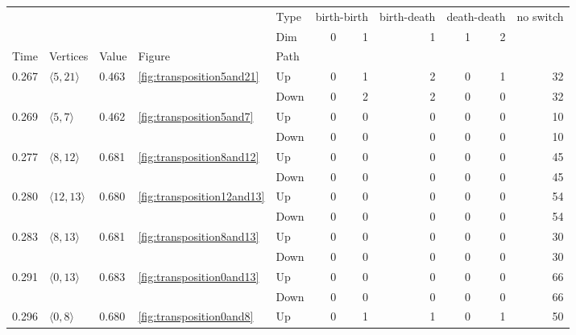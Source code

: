 \documentclass{article}
\begin{document}
\begin{center}
\begin{tabular}{lllllrrrrrr}
\toprule
 &  &  &  & Type & \multicolumn{2}{r}{birth-birth} & birth-death & \multicolumn{2}{r}{death-death} & no switch \\
 &  &  &  & Dim & 0 & 1 & 1 & 1 & 2 &  \\
Time & Vertices & Value & Figure & Path &  &  &  &  &  &  \\
\midrule
\multirow[t]{2}{*}{0.267} & \multirow[t]{2}{*}{$\langle5, 21\rangle$} & \multirow[t]{2}{*}{0.463} & \multirow[t]{2}{*}{\ref{fig:transposition5and21}} & Up & 0 & 1 & 2 & 0 & 1 & 32 \\
 &  &  &  & Down & 0 & 2 & 2 & 0 & 0 & 32 \\
\cline{1-11} \cline{2-11} \cline{3-11} \cline{4-11}
\multirow[t]{2}{*}{0.269} & \multirow[t]{2}{*}{$\langle5, 7\rangle$} & \multirow[t]{2}{*}{0.462} & \multirow[t]{2}{*}{\ref{fig:transposition5and7}} & Up & 0 & 0 & 0 & 0 & 0 & 10 \\
 &  &  &  & Down & 0 & 0 & 0 & 0 & 0 & 10 \\
\cline{1-11} \cline{2-11} \cline{3-11} \cline{4-11}
\multirow[t]{2}{*}{0.277} & \multirow[t]{2}{*}{$\langle8, 12\rangle$} & \multirow[t]{2}{*}{0.681} & \multirow[t]{2}{*}{\ref{fig:transposition8and12}} & Up & 0 & 0 & 0 & 0 & 0 & 45 \\
 &  &  &  & Down & 0 & 0 & 0 & 0 & 0 & 45 \\
\cline{1-11} \cline{2-11} \cline{3-11} \cline{4-11}
\multirow[t]{2}{*}{0.280} & \multirow[t]{2}{*}{$\langle12, 13\rangle$} & \multirow[t]{2}{*}{0.680} & \multirow[t]{2}{*}{\ref{fig:transposition12and13}} & Up & 0 & 0 & 0 & 0 & 0 & 54 \\
 &  &  &  & Down & 0 & 0 & 0 & 0 & 0 & 54 \\
\cline{1-11} \cline{2-11} \cline{3-11} \cline{4-11}
\multirow[t]{2}{*}{0.283} & \multirow[t]{2}{*}{$\langle8, 13\rangle$} & \multirow[t]{2}{*}{0.681} & \multirow[t]{2}{*}{\ref{fig:transposition8and13}} & Up & 0 & 0 & 0 & 0 & 0 & 30 \\
 &  &  &  & Down & 0 & 0 & 0 & 0 & 0 & 30 \\
\cline{1-11} \cline{2-11} \cline{3-11} \cline{4-11}
\multirow[t]{2}{*}{0.291} & \multirow[t]{2}{*}{$\langle0, 13\rangle$} & \multirow[t]{2}{*}{0.683} & \multirow[t]{2}{*}{\ref{fig:transposition0and13}} & Up & 0 & 0 & 0 & 0 & 0 & 66 \\
 &  &  &  & Down & 0 & 0 & 0 & 0 & 0 & 66 \\
\cline{1-11} \cline{2-11} \cline{3-11} \cline{4-11}
\multirow[t]{2}{*}{0.296} & \multirow[t]{2}{*}{$\langle0, 8\rangle$} & \multirow[t]{2}{*}{0.680} & \multirow[t]{2}{*}{\ref{fig:transposition0and8}} & Up & 0 & 1 & 1 & 0 & 1 & 50 \\

\end{tabular}
\end{center}
\end{document}

